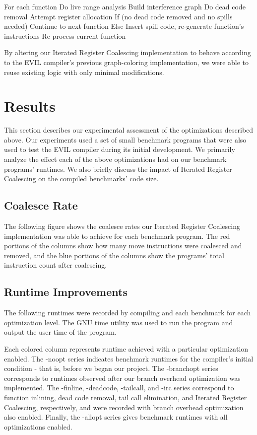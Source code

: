 \documentclass[12pt]{article}
\begin{document}
\begin{multicols}{2}
For each function
Do live range analysis
Build interference graph
Do dead code removal
Attempt register allocation
If (no dead code removed and no spills needed)
Continue to next function
Else
Insert spill code, re-generate function’s instructions
Re-process current function

By altering our Iterated Register Coalescing implementation to behave according to the EVIL compiler’s previous graph-coloring implementation, we were able to reuse existing logic with only minimal modifications.

\section{Results}
This section describes our experimental assessment of the optimizations described above.
Our experiments used a set of small benchmark programs that were also used to test the EVIL compiler during its initial development.
We primarily analyze the effect each of the above optimizations had on our benchmark programs’ runtimes.
We also briefly discuss the impact of Iterated Register Coalescing on the compiled benchmarks’ code size.

\subsection{Coalesce Rate}
The following figure shows the coalesce rates our Iterated Register Coalescing implementation was able to achieve for each benchmark program.
The red portions of the columns show how many move instructions were coalesced and removed, and the blue portions of the columns show the programs’ total instruction count after coalescing.

\subsection{Runtime Improvements}
The following runtimes were recorded by compiling and each benchmark for each optimization level.
The GNU time utility was used to run the program and output the user time of the program.

Each colored column represents runtime achieved with a particular optimization enabled.
The -noopt series indicates benchmark runtimes for the compiler’s initial condition - that is, before we began our project.
The -branchopt series corresponds to runtimes observed after our branch overhead optimization was implemented.
The -finline, -deadcode, -tailcall, and -irc series correspond to function inlining, dead code removal, tail call elimination, and Iterated Register Coalescing, respectively, and were recorded with branch overhead optimization also enabled.
Finally, the -allopt series gives benchmark runtimes with all optimizations enabled.



\end{multicols}
\end{document}
